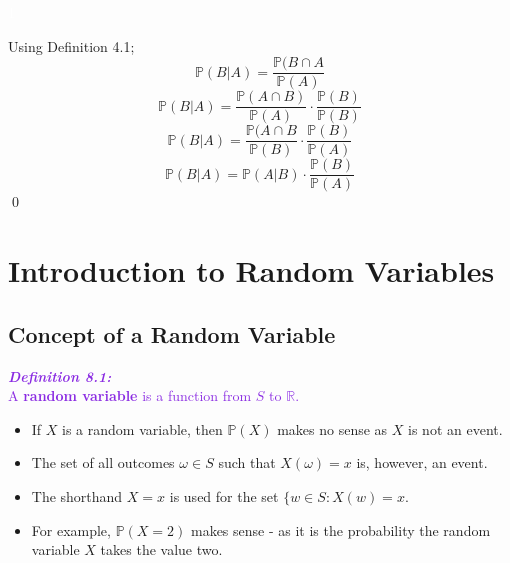 \documentclass{report}
\newenvironment{cframed}[1][BlueViolet]
  {\begin{tcolorbox}[colframe=#1,colback=white]}
  {\end{tcolorbox}}
\newenvironment{cframedp}[1][Black]
  {\begin{tcolorbox}[colframe=#1,colback=white]}
  {\end{tcolorbox}}
\begin{document}
\textcolor{White}{1}

\begin{cframedp}
Using Definition 4.1;
\begin{equation}
    \mathbb{P}(B|A) = \frac{\mathbb{P}(B \cap A}{\mathbb{P}(A)}
\end{equation}
\begin{equation}
    \mathbb{P}(B|A) = \frac{\mathbb{P}(A \cap B)}{\mathbb{P}(A)} \cdot \frac{\mathbb{P}(B)}{\mathbb{P}(B)}
\end{equation}
\begin{equation}
    \mathbb{P}(B|A) = \frac{\mathbb{P}(A \cap B}{\mathbb{P}(B)} \cdot \frac{\mathbb{P}(B)}{\mathbb{P}(A)}
\end{equation}
\begin{equation}
    \mathbb{P}(B|A) = \mathbb{P}(A|B) \cdot \frac{\mathbb{P}(B)}{\mathbb{P}(A)}
\end{equation}
\qed
\end{cframedp}
\chapter{Introduction to Random Variables}
\section{Concept of a Random Variable}

\begin{cframed}
    \textcolor{BlueViolet}{\textbf{\textit{Definition 8.1:}}\\
    A \textbf{random variable} is a function from $S$ to $\mathbb{R}$.}
\end{cframed}
\begin{itemize}
    \item If $X$ is a random variable, then $\mathbb{P}(X)$ makes no sense as $X$ is not an event. 
    \item The set of all outcomes $\omega \in S$ such that $X(\omega) = x$ is, however, an event.
    \item The shorthand $X = x$ is used for the set $\{w \in S : X(w) = x$.
    \item For example, $\mathbb{P}(X = 2)$ makes sense - as it is the probability the random variable $X$ takes the value two. 
\end{itemize}

\end{document}
